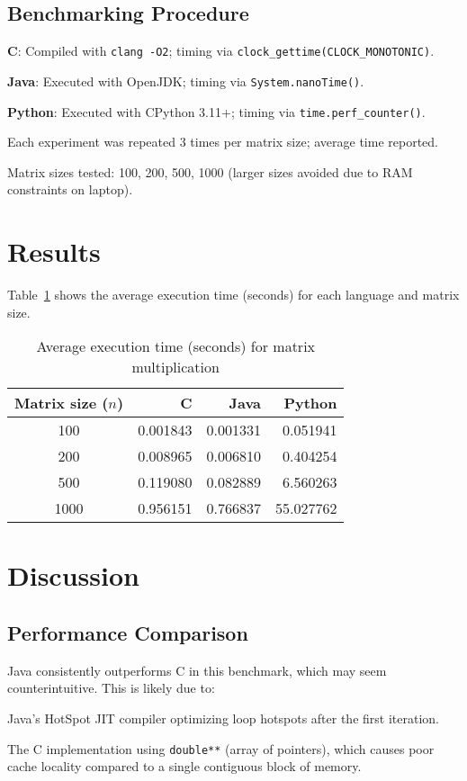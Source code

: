 \documentclass[12pt]{article}
\begin{document}
\subsection{Benchmarking Procedure}
\item \textbf{C}: Compiled with \texttt{clang -O2}; timing via \texttt{clock\_gettime(CLOCK\_MONOTONIC)}.
    \item \textbf{Java}: Executed with OpenJDK; timing via \texttt{System.nanoTime()}.
    \item \textbf{Python}: Executed with CPython 3.11+; timing via \texttt{time.perf\_counter()}.
    \item Each experiment was repeated 3 times per matrix size; average time reported.
    \item Matrix sizes tested: 100, 200, 500, 1000 (larger sizes avoided due to RAM constraints on laptop).

\section{Results}
Table~\ref{tab:results} shows the average execution time (seconds) for each language and matrix size.

\begin{table}[h]
\centering
\caption{Average execution time (seconds) for matrix multiplication}
\label{tab:results}
\begin{tabular}{crrr}
\toprule
Matrix size ($n$) & C & Java & Python \\
\midrule
100 & 0.001843 & 0.001331 & 0.051941 \\
200 & 0.008965 & 0.006810 & 0.404254 \\
500 & 0.119080 & 0.082889 & 6.560263 \\
1000 & 0.956151 & 0.766837 & 55.027762 \\
\bottomrule
\end{tabular}
\end{table}

\section{Discussion}
\subsection{Performance Comparison}
Java consistently outperforms C in this benchmark, which may seem counterintuitive. This is likely due to:
\item Java’s HotSpot JIT compiler optimizing loop hotspots after the first iteration.
    \item The C implementation using \texttt{double**} (array of pointers), which causes poor cache locality compared to a single contiguous block of memory.
\end{document}
